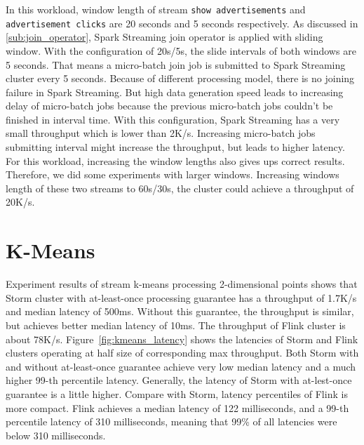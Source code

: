 In this workload, window length of stream \texttt{show advertisements} and \texttt{advertisement clicks} are 20 seconds and 5 seconds respectively. As discussed in \cref{sub:join_operator}, Spark Streaming join operator is applied with sliding window. With the configuration of 20s/5s, the slide intervals of both windows are 5 seconds. That means a micro-batch join job is submitted to Spark Streaming cluster every 5 seconds. Because of different processing model, there is no joining failure in Spark Streaming. But high data generation speed leads to increasing delay of micro-batch jobs because the previous micro-batch jobs couldn't be finished in interval time. With this configuration, Spark Streaming has a very small throughput which is lower than 2K/s. Increasing micro-batch jobs submitting interval might increase the throughput, but leads to higher latency. For this workload, increasing the window lengths also gives ups correct results. Therefore, we did some experiments with larger windows. Increasing windows length of these two streams to 60s/30s, the cluster could achieve a throughput of 20K/s.


\section{K-Means}

Experiment results of stream k-means processing 2-dimensional points shows that Storm cluster with at-least-once processing guarantee has a throughput of 1.7K/s and median latency of 500ms. Without this guarantee, the throughput is similar, but achieves better median latency of 10ms. The throughput of Flink cluster is about 78K/s. Figure~\ref{fig:kmeans_latency} shows the latencies of Storm and Flink clusters operating at half size of corresponding max throughput. Both Storm with and without at-least-once guarantee achieve very low median latency and a much higher 99-th percentile latency. Generally, the latency of Storm with at-lest-once guarantee is a little higher. Compare with Storm, latency percentiles of Flink is more compact. Flink achieves a median latency of 122 milliseconds, and a 99-th percentile latency of 310 milliseconds, meaning that 99\% of all latencies were below 310 milliseconds. 
 
